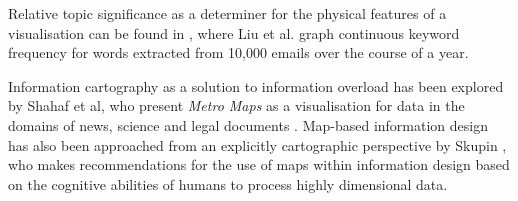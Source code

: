 Relative topic significance as a determiner for the physical features of a visualisation can be found in \citep{InteractiveTopicBasedVisualTextSummarizationAndAnalysis}, where Liu et al. graph continuous keyword frequency for words extracted from 10,000 emails over the course of a year.

Information cartography as a solution to information overload has been explored by Shahaf et al, who present \textit{Metro Maps} as a visualisation for data in the domains of news, science and legal documents \citep{InformationCartography, MetroMapsOfScience, GeneratingInformationMaps}. Map-based information design has also been approached from an explicitly cartographic perspective by Skupin \citep{FromMetaphorToMethod}, who makes recommendations for the use of maps within information design based on the cognitive abilities of humans to process highly dimensional data.\\




